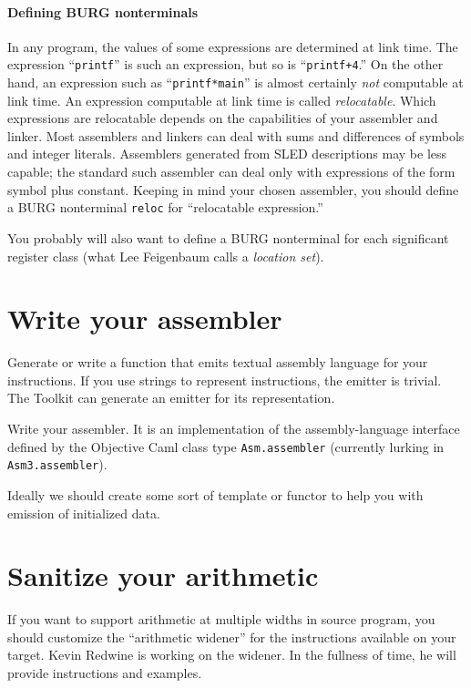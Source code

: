 \documentclass[12pt]{article}
\begin{document}
\paragraph{Defining BURG nonterminals}

In any program, the values of some expressions are determined at link
time.
The expression ``\texttt{printf}'' is such an expression, but so is
``\texttt{printf+4}.'' 
On the other hand, an expression such as ``\texttt{printf*main}'' is
almost certainly \emph{not} computable at link time.
An expression computable at link time is called \emph{relocatable}.
Which expressions are relocatable depends on the capabilities of your
assembler and linker.
Most assemblers and linkers can deal with sums and differences of
symbols and integer literals.
Assemblers generated from SLED descriptions may be less capable; the
standard such assembler can deal only with expressions of the form
symbol plus constant.
Keeping in mind
your chosen assembler, you should define a BURG nonterminal
\texttt{reloc} for
``relocatable expression.''

You probably will also want to define a BURG nonterminal for each
significant register class (what Lee Feigenbaum calls a \emph{location
set}). 

\section{Write your assembler}

Generate or write a function that emits textual assembly language for
your instructions.
If you use strings to represent instructions, the emitter is trivial.
The Toolkit can generate an emitter for its representation.

Write your assembler.
It is an implementation of the assembly-language interface defined by
the Objective Caml class type 
\texttt{Asm.assembler} (currently lurking in \texttt{Asm3.assembler}).

Ideally we should create some sort of template or functor to help you
with emission of initialized data.


\section{Sanitize your arithmetic}

If you want to support arithmetic at multiple widths in source
program, you should customize the ``arithmetic widener'' for the
instructions available on 
your target.
Kevin Redwine is working on the widener.
In the fullness of time, he will provide instructions and
examples.
\end{document}
